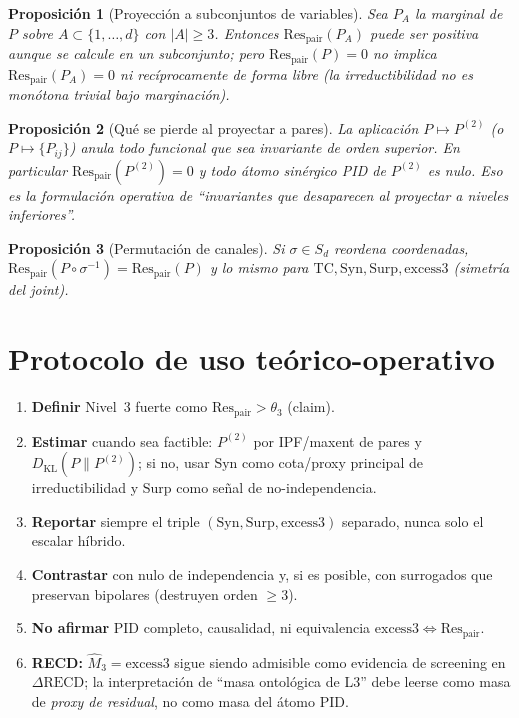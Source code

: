 \documentclass[11pt,a4paper]{article}
\theoremstyle{definition}
\theoremstyle{plain}
\newtheorem{proposition}{Proposici\'on}[section]
\theoremstyle{remark}
\newcommand{\Res}{\mathrm{Res}}
\newcommand{\TC}{\mathrm{TC}}
\newcommand{\Syn}{\mathrm{Syn}}
\newcommand{\Surp}{\mathrm{Surp}}
\newcommand{\excess}{\mathrm{excess3}}
\newcommand{\KL}{D_{\mathrm{KL}}}
\newcommand{\RECD}{\mathrm{RECD}}
\begin{document}
\begin{proposition}[Proyecci\'on a subconjuntos de variables]
\label{prop:marginalize}
Sea $P_A$ la marginal de $P$ sobre $A\subset\{1,\ldots,d\}$ con
$|A|\ge 3$. Entonces $\Res_{\mathrm{pair}}(P_A)$ puede ser positiva
aunque se calcule en un subconjunto; pero
$\Res_{\mathrm{pair}}(P)=0$ \emph{no} implica $\Res_{\mathrm{pair}}(P_A)=0$
ni rec\'iprocamente de forma libre (la irreductibilidad no es mon\'otona
trivial bajo marginaci\'on).
\end{proposition}

\begin{proposition}[Qu\'e se pierde al proyectar a pares]
\label{prop:loses}
La aplicaci\'on $P\mapsto P^{(2)}$ (o $P\mapsto\{P_{ij}\}$) anula todo
funcional que sea invariante de orden superior. En particular
$\Res_{\mathrm{pair}}(P^{(2)})=0$ y todo \'atomo sin\'ergico PID de $P^{(2)}$
es nulo. Eso es la formulaci\'on operativa de ``invariantes que
desaparecen al proyectar a niveles inferiores''.
\end{proposition}

\begin{proposition}[Permutaci\'on de canales]
\label{prop:perm}
Si $\sigma\in S_d$ reordena coordenadas,
$\Res_{\mathrm{pair}}(P\circ\sigma^{-1})=\Res_{\mathrm{pair}}(P)$ y lo
mismo para $\TC,\Syn,\Surp,\excess$ (simetr\'ia del joint).
\end{proposition}

\section{Protocolo de uso te\'orico-operativo}
\label{sec:protocol}

\begin{enumerate}[label=\textbf{P\arabic*.}]
  \item \textbf{Definir} Nivel~3 fuerte como $\Res_{\mathrm{pair}}>\theta_3$
  (claim).
  \item \textbf{Estimar} cuando sea factible: $P^{(2)}$ por IPF/maxent
  de pares y $\KL(P\|P^{(2)})$; si no, usar $\Syn$ como cota/proxy
  principal de irreductibilidad y $\Surp$ como se\~nal de
  no-independencia.
  \item \textbf{Reportar} siempre el triple $(\Syn,\Surp,\excess)$
  separado, nunca solo el escalar h\'ibrido.
  \item \textbf{Contrastar} con nulo de independencia y, si es posible,
  con surrogados que preservan bipolares (destruyen orden $\ge 3$).
  \item \textbf{No afirmar} PID completo, causalidad, ni equivalencia
  $\excess\Leftrightarrow\Res_{\mathrm{pair}}$.
  \item \textbf{RECD:} $\widehat{M}_3=\excess$ sigue siendo admisible
  como evidencia de screening en $\Delta\RECD$; la interpretaci\'on de
  ``masa ontol\'ogica de L3'' debe leerse como masa de
  \emph{proxy de residual}, no como masa del \'atomo PID.
\end{enumerate}
\end{document}
